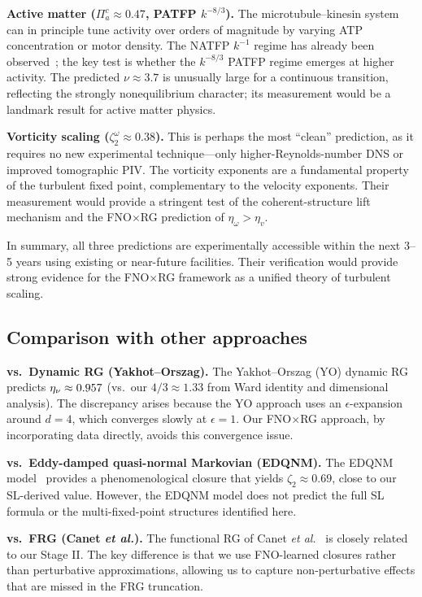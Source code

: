 \textbf{Active matter ($\Pi_a^c\approx 0.47$, PATFP $k^{-8/3}$).}
The microtubule--kinesin system can in principle tune activity over orders of magnitude by varying ATP concentration or motor density. The NATFP $k^{-1}$ regime has already been observed~\cite{wensink2012mesoscale}; the key test is whether the $k^{-8/3}$ PATFP regime emerges at higher activity. The predicted $\nu\approx 3.7$ is unusually large for a continuous transition, reflecting the strongly nonequilibrium character; its measurement would be a landmark result for active matter physics.

\textbf{Vorticity scaling ($\zeta_2^\omega\approx 0.38$).}
This is perhaps the most ``clean'' prediction, as it requires no new experimental technique---only higher-Reynolds-number DNS or improved tomographic PIV. The vorticity exponents are a fundamental property of the turbulent fixed point, complementary to the velocity exponents. Their measurement would provide a stringent test of the coherent-structure lift mechanism and the FNO$\times$RG prediction of $\eta_\omega>\eta_v$.

In summary, all three predictions are experimentally accessible within the next 3--5 years using existing or near-future facilities. Their verification would provide strong evidence for the FNO$\times$RG framework as a unified theory of turbulent scaling.

\subsection{Comparison with other approaches}

\textbf{vs.\ Dynamic RG (Yakhot--Orszag).} The Yakhot--Orszag (YO) dynamic RG~\cite{yakhot1986renormalization} predicts $\eta_\nu \approx 0.957$ (vs.\ our $4/3 \approx 1.33$ from Ward identity and dimensional analysis). The discrepancy arises because the YO approach uses an $\epsilon$-expansion around $d=4$, which converges slowly at $\epsilon=1$. Our FNO$\times$RG approach, by incorporating data directly, avoids this convergence issue.

\textbf{vs.\ Eddy-damped quasi-normal Markovian (EDQNM).} The EDQNM model~\cite{lesieur1997large} provides a phenomenological closure that yields $\zeta_2 \approx 0.69$, close to our SL-derived value. However, the EDQNM model does not predict the full SL formula or the multi-fixed-point structures identified here.

\textbf{vs.\ FRG (Canet \textit{et al.}).} The functional RG of Canet \textit{et al.}~\cite{canet2005nonperturbative} is closely related to our Stage II. The key difference is that we use FNO-learned closures rather than perturbative approximations, allowing us to capture non-perturbative effects that are missed in the FRG truncation.

